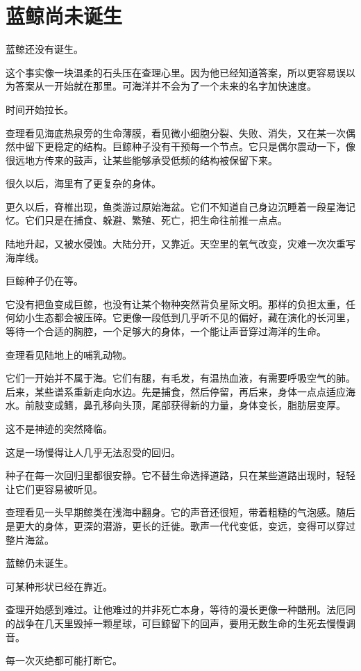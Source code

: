 \chapter{蓝鲸尚未诞生}

蓝鲸还没有诞生。

这个事实像一块温柔的石头压在查理心里。因为他已经知道答案，所以更容易误以为答案从一开始就在那里。可海洋并不会为了一个未来的名字加快速度。

时间开始拉长。

查理看见海底热泉旁的生命薄膜，看见微小细胞分裂、失败、消失，又在某一次偶然中留下更稳定的结构。巨鲸种子没有干预每一个节点。它只是偶尔震动一下，像很远地方传来的鼓声，让某些能够承受低频的结构被保留下来。

很久以后，海里有了更复杂的身体。

更久以后，脊椎出现，鱼类游过原始海盆。它们不知道自己身边沉睡着一段星海记忆。它们只是在捕食、躲避、繁殖、死亡，把生命往前推一点点。

陆地升起，又被水侵蚀。大陆分开，又靠近。天空里的氧气改变，灾难一次次重写海岸线。

巨鲸种子仍在等。

它没有把鱼变成巨鲸，也没有让某个物种突然背负星际文明。那样的负担太重，任何幼小生态都会被压碎。它更像一段低到几乎听不见的偏好，藏在演化的长河里，等待一个合适的胸腔，一个足够大的身体，一个能让声音穿过海洋的生命。

查理看见陆地上的哺乳动物。

它们一开始并不属于海。它们有腿，有毛发，有温热血液，有需要呼吸空气的肺。后来，某些谱系重新走向水边。先是捕食，然后停留，再后来，身体一点点适应海水。前肢变成鳍，鼻孔移向头顶，尾部获得新的力量，身体变长，脂肪层变厚。

这不是神迹的突然降临。

这是一场慢得让人几乎无法忍受的回归。

种子在每一次回归里都很安静。它不替生命选择道路，只在某些道路出现时，轻轻让它们更容易被听见。

查理看见一头早期鲸类在浅海中翻身。它的声音还很短，带着粗糙的气泡感。随后是更大的身体，更深的潜游，更长的迁徙。歌声一代代变低，变远，变得可以穿过整片海盆。

蓝鲸仍未诞生。

可某种形状已经在靠近。

查理开始感到难过。让他难过的并非死亡本身，等待的漫长更像一种酷刑。法厄同的战争在几天里毁掉一颗星球，可巨鲸留下的回声，要用无数生命的生死去慢慢调音。

每一次灭绝都可能打断它。

